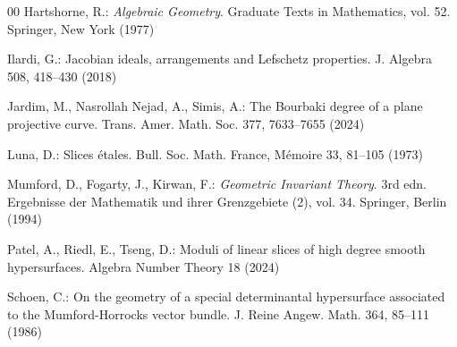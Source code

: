 \documentclass[11pt]{amsart}
\theoremstyle{plain}
\theoremstyle{definition}
\numberwithin{equation}{section}
\begin{document}
\begin{thebibliography}{00}
Hartshorne, R.: \textit{Algebraic Geometry}. Graduate Texts in Mathematics, vol. 52. Springer, New York (1977)

Ilardi, G.: Jacobian ideals, arrangements and Lefschetz properties. J. Algebra 508, 418--430 (2018)

Jardim, M., Nasrollah Nejad, A., Simis, A.: The Bourbaki degree of a plane projective curve. Trans. Amer. Math. Soc. 377, 7633--7655 (2024)

Luna, D.: Slices étales. Bull. Soc. Math. France, Mémoire 33, 81--105 (1973)

Mumford, D., Fogarty, J., Kirwan, F.: \textit{Geometric Invariant Theory}. 3rd edn. Ergebnisse der Mathematik und ihrer Grenzgebiete (2), vol. 34. Springer, Berlin (1994)

Patel, A., Riedl, E., Tseng, D.: Moduli of linear slices of high degree smooth hypersurfaces. Algebra Number Theory 18 (2024)

Schoen, C.: On the geometry of a special determinantal hypersurface associated to the Mumford-Horrocks vector bundle. J. Reine Angew. Math. 364, 85--111 (1986)

\end{thebibliography}
\end{document}
